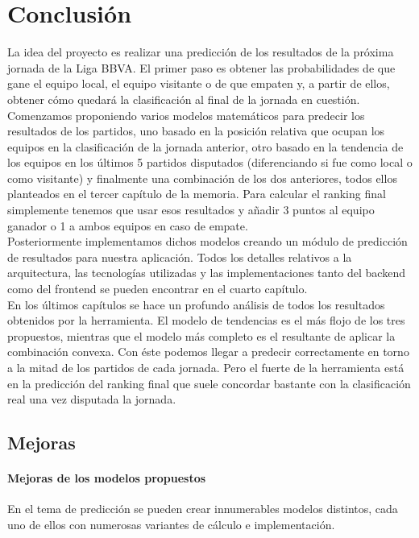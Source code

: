 \chapter{Conclusión}

La idea del proyecto es realizar una predicción de los resultados de la próxima jornada de la Liga BBVA. El primer paso es obtener las probabilidades de que gane el equipo local, el equipo visitante o de que empaten y, a partir de ellos, obtener cómo quedará la clasificación al final de la jornada en cuestión.\\

Comenzamos proponiendo varios modelos matemáticos para predecir los resultados de los partidos, uno basado en la posición relativa que ocupan los equipos en la clasificación de la jornada anterior, otro basado en la tendencia de los equipos en los últimos 5 partidos disputados (diferenciando si fue como local o como visitante) y finalmente una combinación de los dos anteriores, todos ellos planteados en el tercer capítulo de la memoria. Para calcular el ranking final simplemente tenemos que usar esos resultados y añadir 3 puntos al equipo ganador o 1 a ambos equipos en caso de empate.\\
 
Posteriormente implementamos dichos modelos creando un módulo de predicción de resultados para nuestra aplicación. Todos los detalles relativos a la arquitectura, las tecnologías utilizadas y las implementaciones tanto del backend como del frontend se pueden encontrar en el cuarto capítulo.\\  

En los últimos capítulos se hace un profundo análisis de todos los resultados obtenidos por la herramienta. El modelo de tendencias es el más flojo de los tres propuestos, mientras que el modelo más completo es el resultante de aplicar la combinación convexa. Con éste podemos llegar a predecir correctamente  en torno a la mitad de los partidos de cada jornada. Pero el fuerte de la herramienta está en la predicción del ranking final que suele concordar bastante con la clasificación real una vez disputada la jornada.\\

\newpage

\section{Mejoras}

\subsubsection*{Mejoras de los modelos propuestos}
En el tema de predicción se pueden crear innumerables modelos distintos, cada uno de ellos con numerosas variantes de cálculo e implementación. \\

